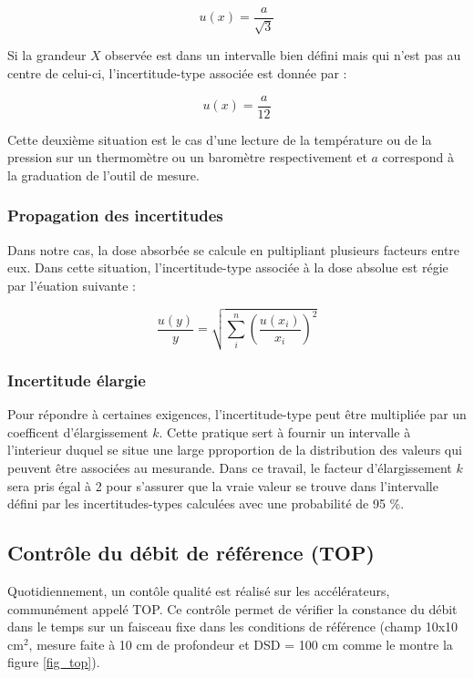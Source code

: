 \documentclass{article}
\begin{document}
\begin{equation}
  u(x) = \dfrac{a}{\sqrt{3}}
\end{equation}

Si la grandeur $X$ observée est dans un intervalle bien défini mais qui n'est pas au centre de celui-ci, l'incertitude-type associée est donnée par :

\begin{equation}
  u(x) = \dfrac{a}{12}
\end{equation}

Cette deuxième situation est le cas d'une lecture de la température ou de la pression sur un thermomètre ou un baromètre respectivement et $a$ correspond à la graduation de l'outil de mesure.

\subsubsection{Propagation des incertitudes}

Dans notre cas, la dose absorbée se calcule en pultipliant plusieurs facteurs entre eux. Dans cette situation, l'incertitude-type associée à la dose absolue est régie par l'éuation suivante :

\begin{equation}
  \dfrac{u(y)}{y} = \sqrt{\sum\limits_i^n \left( \dfrac{u(x_i)}{x_i} \right) ^2}
\end{equation}

\subsubsection{Incertitude élargie}

Pour répondre à certaines exigences, l'incertitude-type peut être multipliée par un coefficent d'élargissement $k$. Cette pratique sert à fournir un intervalle à l'interieur duquel se situe une large pproportion de la distribution des valeurs qui peuvent être associées au mesurande. Dans ce travail, le facteur d'élargissement $k$ sera pris égal à 2 pour s'assurer que la vraie valeur se trouve dans l'intervalle défini par les incertitudes-types calculées avec une probabilité de 95 \%.


\subsection{Contrôle du débit de référence (TOP)}

Quotidiennement, un contôle qualité est réalisé sur les accélérateurs, communément appelé TOP. Ce contrôle permet de vérifier la constance du débit dans le temps sur un faisceau fixe dans les conditions de référence (champ 10x10 cm$^2$, mesure faite à 10 cm de profondeur et DSD = 100 cm comme le montre la figure \ref*{fig_top}). 
\end{document}
